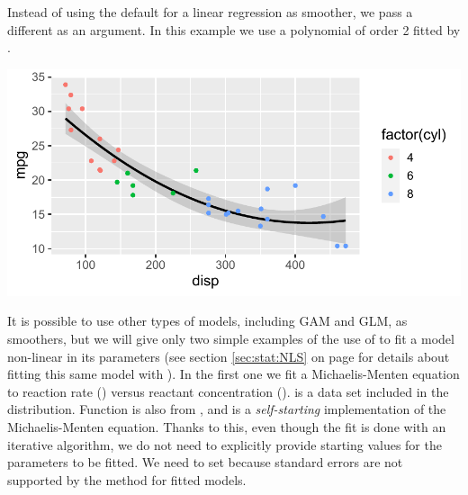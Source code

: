 \documentclass[krantz2]{krantz}\usepackage{knitr}
\begin{document}
Instead of using the default  for a linear regression as smoother, we pass a different  as an argument. In this example we use a polynomial of order 2 fitted by .

\begin{knitrout}\footnotesize
{}\color{fgcolor}\begin{kframe}
\begin{alltt}
\hlstd{(}  \hlstd{(}     \hlstd{=}  \hlopt{+}
  \hlstd{(} \hlstd{=} \hlstd{,}   \hlopt{~}  \hlstd{),}  \hlstd{=} \hlstd{)} \hlopt{+}
  \hlstd{()}
\end{alltt}
\end{kframe}

{\centering \includegraphics[width=.7\textwidth]{figure/pos-smooth-plot-06-1} 

}



\end{knitrout}

It is possible to use other types of models, including GAM and GLM, as smoothers, but we will give only two simple examples of the use of  to fit a model non-linear in its parameters (see section \ref{sec:stat:NLS} on page \pageref{sec:stat:NLS} for details about fitting this same model with ). In the first one we fit a Michaelis-Menten equation to reaction rate () versus reactant concentration ().  is a data set included in the \Rlang distribution. Function  is also from \Rlang, and is a \emph{self-starting} implementation of the Michaelis-Menten equation. Thanks to this, even though the fit is done with an iterative algorithm, we do not need to explicitly provide starting values for the parameters to be fitted. We need to set  because standard errors are not supported by the  method for  fitted models.
\end{document}
